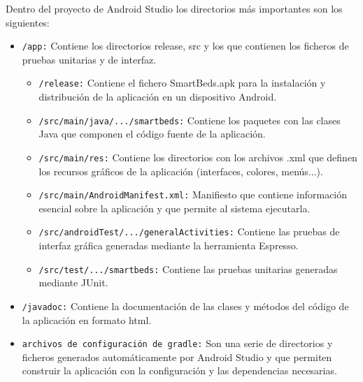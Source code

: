 Dentro del proyecto de Android Studio los directorios más importantes son los siguientes: 
\begin{itemize}
	\item \texttt{/app:} Contiene los directorios release, src y los que contienen los ficheros de pruebas unitarias y de interfaz. 
	\begin{itemize}
		\item \texttt{/release:} Contiene el fichero SmartBeds.apk para la instalación y distribución de la aplicación en un dispositivo Android. 
		\item \texttt{/src/main/java/.../smartbeds:} Contiene los paquetes con las clases Java que componen el código fuente de la aplicación. 
		\item \texttt{/src/main/res:} Contiene los directorios con los archivos .xml que definen los recursos gráficos de la aplicación (interfaces, colores, menús...). 
		\item \texttt{/src/main/AndroidManifest.xml:} Manifiesto que contiene información esencial sobre la aplicación y que permite al sistema ejecutarla. 
		\item \texttt{/src/androidTest/.../generalActivities:} Contiene las pruebas de interfaz gráfica generadas mediante la herramienta Espresso. 
		\item \texttt{/src/test/.../smartbeds:} Contiene las pruebas unitarias generadas mediante JUnit. 
	\end{itemize}
	\item \texttt{/javadoc:} Contiene la documentación de las clases y métodos del código de la aplicación en formato html. 
	\item \texttt{archivos de configuración de gradle:} Son una serie de directorios y ficheros generados automáticamente por Android Studio y que permiten construir la aplicación con la configuración y las dependencias necesarias. 
\end{itemize}

